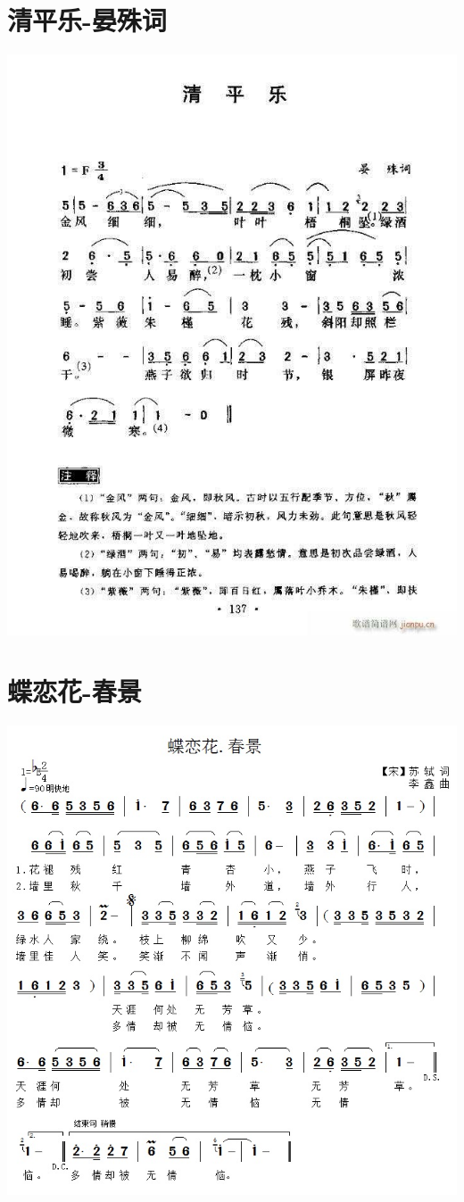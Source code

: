 \documentclass[cn,pad,chinese,chinesefont=nofont,math=newtx]{elegantbook}
\begin{document}
\section{清平乐-晏殊词}
    \includegraphics[width=\textwidth]{dongxiao/20200411-清平乐-晏殊.jpg}
\section{蝶恋花-春景}
    \includegraphics[width=\textwidth]{dongxiao/20200411-蝶恋花-春景.jpg}
\end{document}
